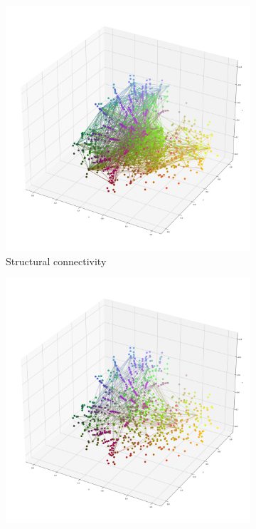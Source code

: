 \documentclass[]{article}
\begin{document}
\begin{figure}
	\centering
	\begin{subfigure}{.3\textwidth}
		\centering
		\includegraphics[width=.9\linewidth]{plotted_figures/struc_3d_conn_plot.png}
		\caption{Structural connectivity}
		\label{fig:struc_conn_vis}
	\end{subfigure}
	\begin{subfigure}{.3\textwidth}
		\centering
		\includegraphics[width=.9\linewidth]{plotted_figures/func_3d_conn_plot.png}

\end{subfigure}
\end{figure}
\end{document}

